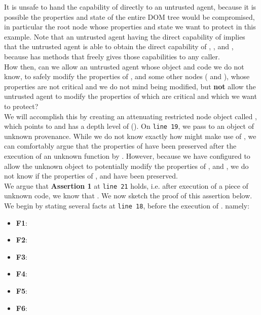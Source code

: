 \documentclass[a4paper,11pt,twoside]{article}
\begin{document}
\vspace{0.5em}
It is unsafe to hand the capability of  directly to an untrusted agent, because it is possible the properties and state of the entire DOM tree would be compromised, in particular the root node  whose properties and state we want to protect in this example. Note that an untrusted agent having the direct capability of  implies that the untrusted agent is able to obtain the direct capability of , , and , because  has methods that freely gives those capabilities to any caller.\\

 How then, can we allow an untrusted agent whose object and code we do not know, to safely modify the properties of ,  and some other nodes ( and ), whose properties are not critical and we do not mind being modified, but \textbf{not} allow the untrusted agent to modify the properties of  which are critical and which we want to protect?\\

We will accomplish this by creating an attenuating restricted node object called , which points to  and has a depth level of  (). On \texttt{line 19}, we pass  to an object  of unknown provenance. While we do not know exactly how  might make use of , we can comfortably argue that the properties of  have been preserved after the execution of an unknown  function by . However, because we have configured  to allow the unknown object to potentially modify the properties of ,  and , we do not know if the properties of ,  and  have been preserved.\\

We argue that \textbf{Assertion 1} at \texttt{line 21} holds, i.e. after execution of a piece of unknown code, we know that . We now sketch the proof of this assertion below.\\

We begin by stating several facts at \texttt{line 18}, before the execution of . namely:
\begin{itemize}
\item \textbf{F1}: 
\item \textbf{F2}: 
\item \textbf{F3}: 
\item \textbf{F4}: 
\item \textbf{F5}: 
\item \textbf{F6}: 
\end{itemize}
\end{document}

